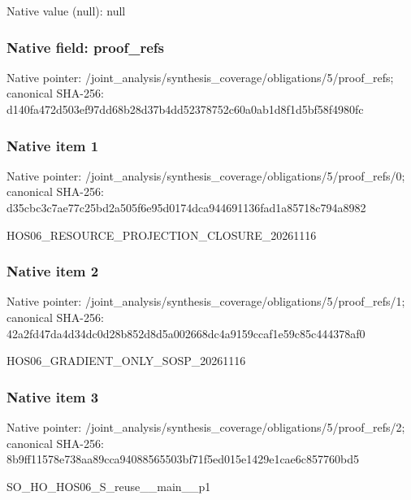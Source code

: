 \documentclass[10pt,a4paper]{article}
\begin{document}
Native value (null): null

\subsubsection{Native field: proof\_\allowbreak{}refs}
Native pointer: /joint\_\allowbreak{}analysis/synthesis\_\allowbreak{}coverage/obligations/5/proof\_\allowbreak{}refs; canonical SHA-256: d140fa472d503ef97dd68b28d37b4dd52378752c60a0ab1d8f1d5bf58f4980fc

\subsubsection{Native item 1}
Native pointer: /joint\_\allowbreak{}analysis/synthesis\_\allowbreak{}coverage/obligations/5/proof\_\allowbreak{}refs/0; canonical SHA-256: d35cbc3c7ae77c25bd2a505f6e95d0174dca944691136fad1a85718c794a8982

\begingroup\raggedright\sloppy HOS06\_\allowbreak{}RESOURCE\_\allowbreak{}PROJECTION\_\allowbreak{}CLOSURE\_\allowbreak{}20261116\par\endgroup

\subsubsection{Native item 2}
Native pointer: /joint\_\allowbreak{}analysis/synthesis\_\allowbreak{}coverage/obligations/5/proof\_\allowbreak{}refs/1; canonical SHA-256: 42a2fd47da4d34dc0d28b852d8d5a002668dc4a9159ccaf1e59c85c444378af0

\begingroup\raggedright\sloppy HOS06\_\allowbreak{}GRADIENT\_\allowbreak{}ONLY\_\allowbreak{}SOSP\_\allowbreak{}20261116\par\endgroup

\subsubsection{Native item 3}
Native pointer: /joint\_\allowbreak{}analysis/synthesis\_\allowbreak{}coverage/obligations/5/proof\_\allowbreak{}refs/2; canonical SHA-256: 8b9ff11578e738aa89cca94088565503bf71f5ed015e1429e1cae6c857760bd5

\begingroup\raggedright\sloppy SO\_\allowbreak{}HO\_\allowbreak{}HOS06\_\allowbreak{}S\_\allowbreak{}reuse\_\allowbreak{}\_\allowbreak{}main\_\allowbreak{}\_\allowbreak{}p1\par\endgroup
\end{document}
